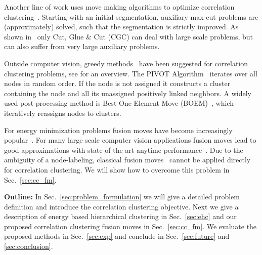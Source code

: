 Another line of work uses move making algorithms 
to optimize correlation clustering~\cite{bagon_2011_arxiv,beier_2014_cvpr,Kernighan-1970}.
Starting with an initial segmentation, auxiliary max-cut problems are (approximately) solved,
such that the segmentation is strictly improved.
As shown in~\cite{beier_2014_cvpr} only Cut, Glue \& Cut (CGC)
can deal with large scale problems, but can also suffer from very large auxiliary problems.

Outside computer vision, greedy methods~\cite{Soon-2001,Ng-2002,Gionis-2007,Elsner-2008,Ailon-2008} have been suggested for correlation clustering problems, see \cite{Elsner-2009} for an overview.
The PIVOT Algorithm~\cite{Ailon-2008} iterates over all nodes in random order.
If the node is not assigned it constructs a cluster containing the node and all its 
unassigned positively linked neighbors.  
%
A widely used post-processing method is  Best One Element Move (BOEM)~\cite{Gionis-2007}, which iteratively reassigns nodes to clusters.

For energy minimization problems fusion moves have become increasingly popular~\cite{Lempitsky-2010,kappes_2014_ws}.
For many large scale computer vision applications fusion moves lead to good approximations
with state of the art anytime performance~\cite{kappes_2014_ws}.
Due to the ambiguity of a node-labeling, classical fusion moves~\cite{Lempitsky-2010} cannot be applied directly for correlation clustering.
We will show how to overcome this problem in Sec.~\ref{sec:cc_fm}.


\vspace{0.1cm}
\noindent \textbf{Outline:} 
In Sec.~\ref{sec:problem_formulation} we will give a 
detailed problem definition and introduce 
the correlation clustering objective.
Next we give a description of energy based hierarchical clustering in Sec.~\ref{sec:ehc} and
our proposed correlation clustering fusion moves in Sec.~\ref{sec:cc_fm}.
We evaluate the proposed methods in Sec.~\ref{sec:exp} and conclude in Sec.~\ref{sec:future} and \ref{sec:conclusion}.



